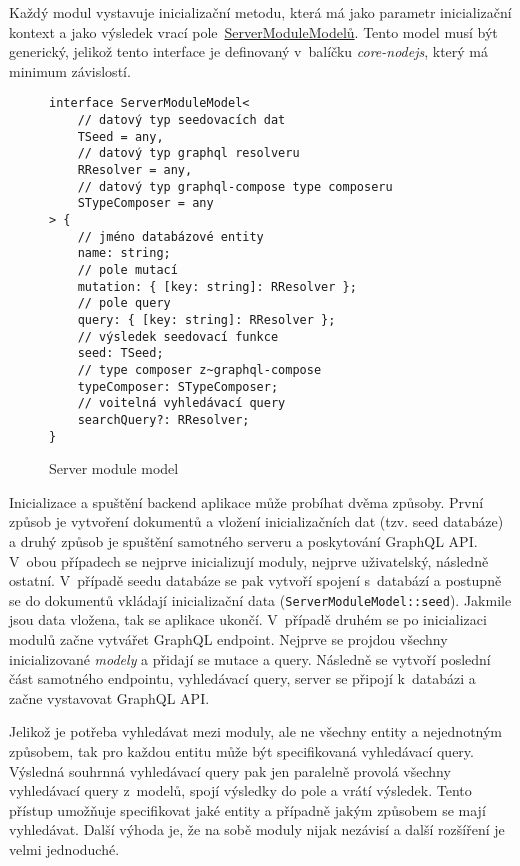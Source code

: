 Každý modul vystavuje inicializační metodu, která má jako parametr inicializační kontext a jako výsledek vrací pole~\hyperref[code:server_module_model]{ServerModuleModelů}. Tento model musí být generický, jelikož tento interface je definovaný v~balíčku \emph{core-nodejs}, který má minimum závislostí.

\begin{figure}[h!]
    \centering
    \begin{verbatim}
interface ServerModuleModel<
    // datový typ seedovacích dat    
    TSeed = any,
    // datový typ graphql resolveru
    RResolver = any,
    // datový typ graphql-compose type composeru
    STypeComposer = any
> {
    // jméno databázové entity    
    name: string;
    // pole mutací
    mutation: { [key: string]: RResolver };
    // pole query
    query: { [key: string]: RResolver };
    // výsledek seedovací funkce
    seed: TSeed;
    // type composer z~graphql-compose 
    typeComposer: STypeComposer;
    // voitelná vyhledávací query
    searchQuery?: RResolver;
}
    \end{verbatim}
    \caption{Server module model}
    \label{code:server_module_model}
\end{figure}

Inicializace a spuštění backend aplikace může probíhat dvěma způsoby. První způsob je vytvoření dokumentů a vložení inicializačních dat (tzv. seed databáze) a druhý způsob je spuštění samotného serveru a poskytování GraphQL API. V~obou případech se nejprve inicializují moduly, nejprve uživatelský, následně ostatní. V~případě seedu databáze se pak vytvoří spojení s~databází a postupně se do dokumentů vkládají inicializační data (\texttt{ServerModuleModel::seed}). Jakmile jsou data vložena, tak se aplikace ukončí. V~případě druhém se po inicializaci modulů začne vytvářet GraphQL endpoint. Nejprve se projdou všechny inicializované \emph{modely} a přidají se mutace a query. Následně se vytvoří poslední část samotného endpointu, vyhledávací query, server se připojí k~databázi a začne vystavovat GraphQL API.

Jelikož je potřeba vyhledávat mezi moduly, ale ne všechny entity a nejednotným způsobem, tak pro každou entitu může být specifikovaná vyhledávací query. Výsledná souhrnná vyhledávací query pak jen paralelně provolá všechny vyhledávací query z~modelů, spojí výsledky do pole a vrátí výsledek. Tento přístup umožňuje specifikovat jaké entity a případně jakým způsobem se mají vyhledávat. Další výhoda je, že na sobě moduly nijak nezávisí a další rozšíření je velmi jednoduché.
